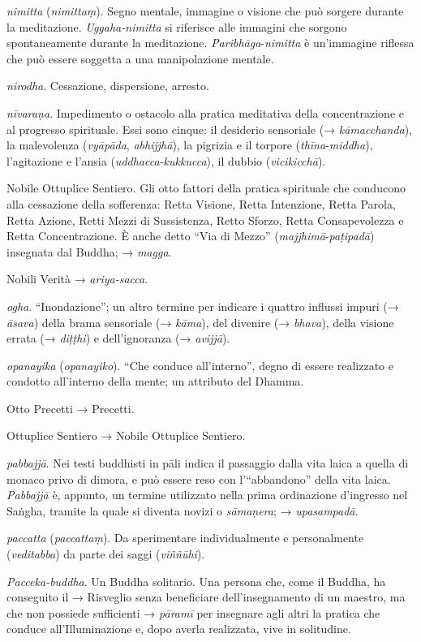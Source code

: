 \emph{nimitta} (\emph{nimittaṃ}). Segno mentale, immagine o visione che
può sorgere durante la meditazione. \emph{Uggaha-nimitta} si riferisce
alle immagini che sorgono spontaneamente durante la meditazione.
\emph{Paribhāga}-\emph{nimitta} è un'immagine riflessa che può essere
soggetta a una manipolazione mentale.

\emph{nirodha}. Cessazione, dispersione, arresto.

\emph{nīvaraṇa}. Impedimento o ostacolo alla pratica meditativa della
concentrazione e al progresso spirituale. Essi sono cinque: il desiderio
sensoriale (→ \emph{kāmacchanda}), la malevolenza (\emph{vyāpāda},
\emph{abhijjhā}), la pigrizia e il torpore (\emph{thīna}-\emph{middha}),
l'agitazione e l'ansia (\emph{uddhacca-kukkucca}), il dubbio
(\emph{vicikicchā}).

Nobile Ottuplice Sentiero. Gli otto fattori della pratica spirituale che
conducono alla cessazione della sofferenza: Retta Visione, Retta
Intenzione, Retta Parola, Retta Azione, Retti Mezzi di Sussistenza,
Retto Sforzo, Retta Consapevolezza e Retta Concentrazione. È anche detto
``Via di Mezzo'' (\emph{majjhimā}-\emph{paṭipadā}) insegnata dal Buddha;
→ \emph{magga}.

Nobili Verità → \emph{ariya-sacca}.

\emph{ogha}. ``Inondazione''; un altro termine per indicare i quattro
influssi impuri (→ \emph{āsava}) della brama sensoriale (→ \emph{kāma}),
del divenire (→ \emph{bhava}), della visione errata (→ \emph{diṭṭhi}) e
dell'ignoranza (→ \emph{avijjā}).

\emph{opanayika} (\emph{opanayiko}). ``Che conduce all'interno'', degno
di essere realizzato e condotto all'interno della mente; un attributo
del Dhamma.

Otto Precetti → Precetti.

Ottuplice Sentiero → Nobile Ottuplice Sentiero.

\emph{pabbajjā}. Nei testi buddhisti in pāli indica il passaggio dalla
vita laica a quella di monaco privo di dimora, e può essere reso con
l'``abbandono'' della vita laica. \emph{Pabbajjā} è, appunto, un termine
utilizzato nella prima ordinazione d'ingresso nel Saṅgha, tramite la
quale si diventa novizi o \emph{sāmaṇera}; → \emph{upasampadā}.

\emph{paccatta} (\emph{paccattaṃ}). Da sperimentare individualmente e
personalmente (\emph{veditabba}) da parte dei saggi (\emph{viññūhi}).

\emph{Pacceka-buddha}. Un Buddha solitario. Una persona che, come il
Buddha, ha conseguito il → Risveglio senza beneficiare
dell'insegnamento di un maestro, ma che non possiede sufficienti →
\emph{pāramī} per insegnare agli altri la pratica che conduce
all'Illuminazione e, dopo averla realizzata, vive in solitudine.

